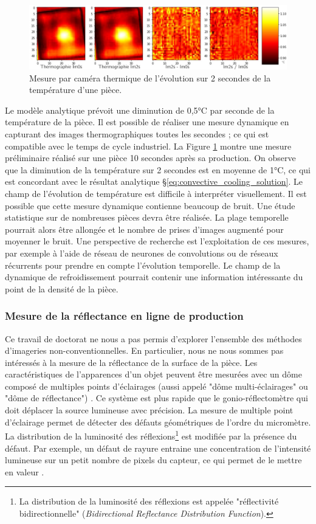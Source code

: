 \begin{figure}[hbtp]
	\centering
	\includegraphics[width=\textwidth]{../Chap2/Figures/thermo_dynamic.jpg}
	\caption{Mesure par caméra thermique de l'évolution sur 2 secondes de la température d'une pièce.}
	\label{fig:thermo_dynamic}
\end{figure}

Le modèle analytique prévoit une diminution de 0,5°C par seconde de la température de la pièce.
Il est possible de réaliser une mesure dynamique en capturant des images thermographiques toutes les secondes ; ce qui est compatible avec le temps de cycle industriel.
La Figure \ref{fig:thermo_dynamic} montre une mesure préliminaire réalisé sur une pièce 10 secondes après sa production.
On observe que la diminution de la température sur 2 secondes est en moyenne de 1°C, ce qui est concordant avec le résultat analytique §\ref{eq:convective_cooling_solution}.
Le champ de l'évolution de température est difficile à interpréter visuellement.
Il est possible que cette mesure dynamique contienne beaucoup de bruit.
Une étude statistique sur de nombreuses pièces devra être réalisée.
La plage temporelle pourrait alors être allongée et le nombre de prises d'images augmenté pour moyenner le bruit.
Une perspective de recherche est l'exploitation de ces mesures, par exemple à l'aide de réseau de neurones de convolutions ou de réseaux récurrents pour prendre en compte l'évolution temporelle.
Le champ de la dynamique de refroidissement pourrait contenir une information intéressante du point de la densité de la pièce.

\subsubsection{Mesure de la réflectance en ligne de production}
Ce travail de doctorat ne nous a pas permis d'explorer l'ensemble des méthodes d'imageries non-conventionnelles.
En particulier, nous ne nous sommes pas intéressés à la mesure de la réflectance de la surface de la pièce.
Les caractéristiques de l'apparences d'un objet peuvent être mesurées avec un dôme composé de multiples points d'éclairages (aussi appelé "dôme multi-éclairages" ou "dôme de réflectance") \cite{marschner_imagebased_2000, ghosh_brdf_2007}.
Ce système est plus rapide que le gonio-réflectomètre qui doit déplacer la source lumineuse avec précision.
La mesure de multiple point d'éclairage permet de détecter des défauts géométriques de l'ordre du micromètre.
La distribution de la luminosité des réflexions\footnote{La distribution de la luminosité des réflexions est appelée "réflectivité bidirectionnelle" (\textit{Bidirectional Reflectance Distribution Function}).} est modifiée par la présence du défaut.
Par exemple, un défaut de rayure entraine une concentration de l'intensité lumineuse sur un petit nombre de pixels du capteur, ce qui permet de le mettre en valeur \cite{desage_visual_2014}.

